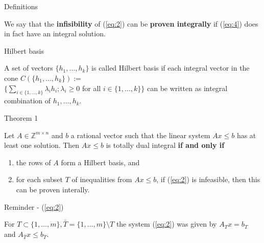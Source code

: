 \documentclass{beamer}
\begin{document}
\begin{frame}{Definitions}

	\begin{block}

		We say that the \textbf{infisibility} of (\ref{eq:2}) can be \textbf{proven integrally} if (\ref{eq:4}) does in fact have an integral solution. 

	\end{block}

	\begin{block}{Hilbert basis}

		A set of vectors $\{h_1, \dots, h_k\}$ is called Hilbert basis if each integral vector in the cone $C(\{h_1, \dots, h_k\}) :=$\\ $\{\sum_{i\in \{ 1,\dots,k \}} \lambda_i h_i; \lambda_i \geq 0$ for all $i \in \{1,\dots,k\} \}$ can be written as integral combination of $h_1, \dots, h_k$.

	\end{block}

\end{frame}



\begin{frame}

	\begin{block}{Theorem 1}

		Let $A\in \mathbb{Z}^{m \times n}$ and $b$ a rational vector such that the linear system $Ax \leq b$ has at least one solution. Then $Ax \leq b$ is totally dual integral \textbf{if and only if}\\

		\begin{enumerate}[i]

			\item the rows of $A$ form a Hilbert basis, and

			\item for each subset $T$ of inequalities from $Ax\leq b$, if (\ref{eq:2}) is infeasible, then this can be proven interally.

		\end{enumerate}

	\end{block}

	\begin{block}{Reminder - (\ref{eq:2})}

		For $T\subset \{ 1, \dots, m\}, \bar{T} = \{1, \dots, m \} \setminus T$ the system (\ref{eq:2}) was given by $A_T x= b_T$ and $A_{\bar{T}}x\leq b_{\bar{T}}$.

	\end{block}

\end{frame}
\end{document}

